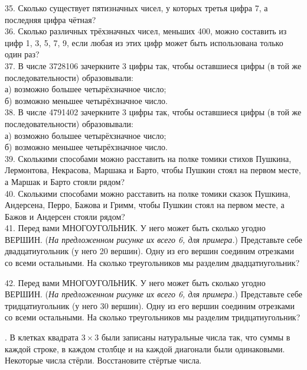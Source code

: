 35. Сколько существует пятизначных чисел, у которых третья цифра 7, а последняя цифра чётная?\\
36. Сколько различных трёхзначных чисел, меньших 400, можно составить из цифр 1, 3, 5, 7, 9, если любая из этих цифр может быть использована только один раз?\\
37. В числе 3728106 зачеркните 3 цифры так, чтобы оставшиеся цифры (в той же последовательности) образовывали:\\
а) возможно большее четырёхзначное число;\\
б) возможно меньшее четырёхзначное число.\\
38. В числе 4791402 зачеркните 3 цифры так, чтобы оставшиеся цифры (в той же последовательности) образовывали:\\
а) возможно большее четырёхзначное число;\\
б) возможно меньшее четырёхзначное число.\\
39. Сколькими способами можно расставить на полке томики стихов Пушкина, Лермонтова, Некрасова, Маршака и Барто, чтобы Пушкин стоял на первом месте, а Маршак и Барто стояли рядом?\\
40. Сколькими способами можно расставить на полке томики сказок Пушкина, Андерсена, Перро, Бажова и Гримм, чтобы Пушкин стоял на первом месте, а Бажов и Андерсен стояли рядом?\\
41. Перед вами МНОГОУГОЛЬНИК. У него может быть сколько угодно ВЕРШИН. ({\it На предложенном рисунке их всего 6, для примера.}) Представьте себе двадцатиугольник (у него 20 вершин). Одну из его вершин соединим отрезками со всеми остальными. На сколько треугольников мы разделим двадцатиугольник?
\begin{center}
\begin{figure}[ht!]
\end{figure}
\end{center}
42. Перед вами МНОГОУГОЛЬНИК. У него может быть сколько угодно ВЕРШИН. ({\it На предложенном рисунке их всего 6, для примера.}) Представьте себе тридцатиугольник (у него 30 вершин). Одну из его вершин соединим отрезками со всеми остальными. На сколько треугольников мы разделим тридцатиугольник?
\begin{center}
\begin{figure}[ht!]
\end{figure}
\end{center}
\newpage
{}. В клетках квадрата $3\times3$ были записаны натуральные числа так, что суммы в каждой строке, в каждом столбце и на каждой диагонали были одинаковыми. Некоторые числа стёрли. Восстановите стёртые числа.
